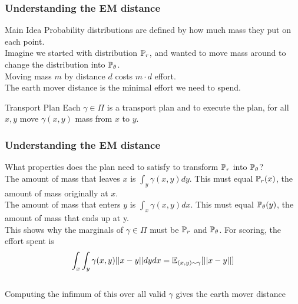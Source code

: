 \documentclass{beamer}
\begin{document}
\begin{frame}
\frametitle{Understanding the EM distance}
\pause
\begin{block}{Main Idea}
Probability distributions are defined by how much mass they put on each point. \\
\vspace{0.12in}
\pause
Imagine we started with distribution $\P_{r}$, and wanted to move mass around to change the distribution into $\P_{\theta}$. \\
\vspace{0.12in}
\pause
Moving mass $m$ by distance $d$ costs $m \cdot d$ effort. \\
\vspace{0.12in}
\pause
The earth mover distance is the minimal effort we need to spend. \\
\end{block}
\pause
\begin{block}{Transport Plan}
Each $\gamma \in \Pi$ is a transport plan and to execute the plan, for all $x,y$ move $\gamma(x,y)$ mass from $x$ to $y$.

\end{block}
\end{frame}

\begin{frame}
\frametitle{Understanding the EM distance}

\pause
What properties does the plan need to satisfy to transform $\P_{r}$ into $\P_{\theta}$? \\
\vspace{0.12in}
\pause
The amount of mass that leaves $x$ is $\int_{y} \gamma(x,y) dy$. This must equal $\P_{r}(x)$, the amount of mass originally at $x$.\\
\vspace{0.12in}
\pause
The amount of mass that enters $y$ is $\int_{x} \gamma(x,y) dx$. This must equal $\P_{\theta}(y)$, the amount of mass that ends up at y.\\
\vspace{0.12in}
\pause
This shows why the marginals of $\gamma \in \Pi$ must be $\P_{r}$ and $\P_{\theta}$. For scoring, the effort spent is $$\int_{x} \int_{y} \gamma(x,y) ||x-y|| dydx = \E_{(x,y) \sim \gamma} [ ||x-y|| ]$$\\
\vspace{0.12in}
\pause
Computing the infimum of this over all valid $\gamma$ gives the earth mover distance
\end{frame}
\end{document}
